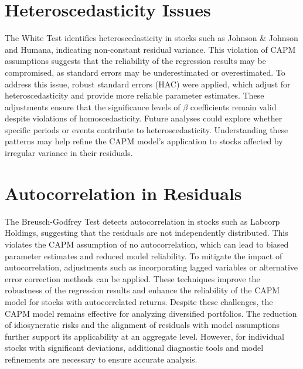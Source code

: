 \section{Heteroscedasticity Issues}
The White Test identifies heteroscedasticity in stocks such as Johnson \& Johnson and Humana, indicating non-constant residual variance. This violation of CAPM assumptions suggests that the reliability of the regression results may be compromised, as standard errors may be underestimated or overestimated.
To address this issue, robust standard errors (HAC) were applied, which adjust for heteroscedasticity and provide more reliable parameter estimates. These adjustments ensure that the significance levels of $\beta$ coefficients remain valid despite violations of homoscedasticity.
Future analyses could explore whether specific periods or events contribute to heteroscedasticity. Understanding these patterns may help refine the CAPM model's application to stocks affected by irregular variance in their residuals.

\section{Autocorrelation in Residuals}
The Breusch-Godfrey Test detects autocorrelation in stocks such as Labcorp Holdings, suggesting that the residuals are not 
independently distributed.
This violates the CAPM assumption of no autocorrelation, which can lead to biased parameter estimates and reduced model 
reliability.
To mitigate the impact of autocorrelation, adjustments such as incorporating lagged variables or alternative error correction
methods can be applied. 
These techniques improve the robustness of the regression results and enhance the reliability of the CAPM model for stocks 
with autocorrelated returns.
Despite these challenges, the CAPM model remains effective for analyzing diversified portfolios.
The reduction of idiosyncratic risks and the alignment of residuals with model assumptions further support its applicability 
at an aggregate level.
However, for individual stocks with significant deviations, additional diagnostic tools and model refinements are necessary to 
ensure accurate analysis.